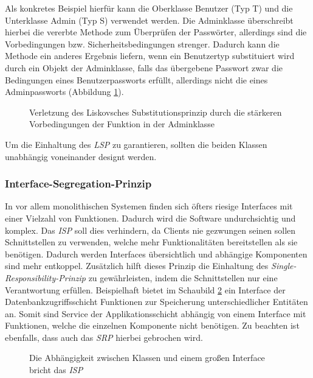 \documentclass[conference]{IEEEtran}
\begin{document}
Als konkretes Beispiel hierfür kann die Oberklasse Benutzer (Typ T) und die Unterklasse Admin (Typ S) verwendet werden. Die Adminklasse überschreibt hierbei die vererbte Methode zum Überprüfen der Passwörter, allerdings sind die Vorbedingungen bzw. Sicherheitsbedingungen strenger. Dadurch kann die Methode ein anderes Ergebnis liefern, wenn ein Benutzertyp substituiert wird durch ein Objekt der Adminklasse, falls das übergebene Passwort zwar die Bedingungen eines Benutzerpassworts erfüllt, allerdings nicht die eines Adminpassworts (Abbildung \ref{fig:VorLSP}). 


\begin{figure}[htbp]
	\small
	
	\caption{Verletzung des Liskovsches Substitutionsprinzip durch die stärkeren Vorbedingungen der Funktion in der Adminklasse }
	\label{fig:VorLSP}
\end{figure}

Um die Einhaltung des \emph{LSP} zu garantieren, sollten die beiden Klassen unabhängig voneinander designt werden.



\subsubsection{Interface-Segregation-Prinzip} In vor allem monolithischen Systemen finden sich öfters riesige Interfaces mit einer Vielzahl von Funktionen. Dadurch wird die Software undurchsichtig und komplex. Das \emph{ISP} soll dies verhindern, da Clients nie gezwungen seinen sollen Schnittstellen zu verwenden, welche mehr Funktionalitäten bereitstellen als sie benötigen. Dadurch werden Interfaces übersichtlich und abhängige Komponenten sind mehr entkoppel.
Zusätzlich hilft dieses Prinzip die Einhaltung des \emph{Single-Responsibility-Prinzip} zu gewährleisten, indem die Schnittstellen nur eine Verantwortung erfüllen. Beispielhaft bietet im Schaubild \ref{fig:VorISP} ein Interface der Datenbankzugriffsschicht Funktionen zur Speicherung unterschiedlicher Entitäten an. Somit sind Service der Applikationsschicht abhängig von einem Interface mit Funktionen, welche die einzelnen Komponente nicht benötigen. Zu beachten ist ebenfalls, dass auch das \emph{SRP} hierbei gebrochen wird.

\begin{figure}[htbp]
	\small
	
	\caption{Die Abhängigkeit zwischen Klassen und einem großen Interface bricht das \emph{ISP} }
	\label{fig:VorISP}
\end{figure}
\end{document}
